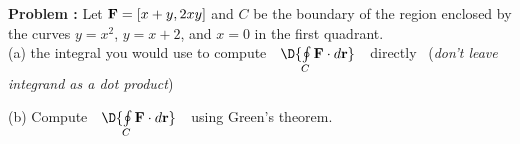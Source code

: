{\bf Problem :} Let $\text{\bf F} = [x+y,2xy]$ and $C$ be the boundary of the region enclosed by the curves $y=x^2$, $y=x+2$, and $x=0$ in the first quadrant. \\
(a)  the integral you would use to compute \,\, $\D{\oint \limits_{C} \text{\bf F}\cdot d\text{\bf r}}$ \,\, directly \,\,\,({\em don't leave integrand as a dot product})

(b) Compute \,\, $\D{\oint \limits_{C} \text{\bf F}\cdot d\text{\bf r}}$ \,\, using Green's theorem.
